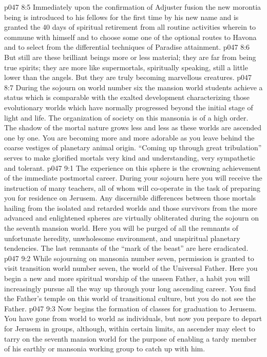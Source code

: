 \vs p047 8:5 Immediately upon the confirmation of Adjuster fusion the new morontia being is introduced to his fellows for the first time by his new name and is granted the 40 days of spiritual retirement from all routine activities wherein to commune with himself and to choose some one of the optional routes to Havona and to select from the differential techniques of Paradise attainment.
\vs p047 8:6 \pc But still are these brilliant beings more or less material; they are far from being true spirits; they are more like supermortals, spiritually speaking, still a little lower than the angels. But they are truly becoming marvellous creatures.
\vs p047 8:7 During the sojourn on world number six the mansion world students achieve a status which is comparable with the exalted development characterizing those evolutionary worlds which have normally progressed beyond the initial stage of light and life. The organization of society on this mansonia is of a high order. The shadow of the mortal nature grows less and less as these worlds are ascended one by one. You are becoming more and more adorable as you leave behind the coarse vestiges of planetary animal origin. “Coming up through great tribulation” serves to make glorified mortals very kind and understanding, very sympathetic and tolerant.
\vs p047 9:1 The experience on this sphere is the crowning achievement of the immediate postmortal career. During your sojourn here you will receive the instruction of many teachers, all of whom will co\hyp{}operate in the task of preparing you for residence on Jerusem. Any discernible differences between those mortals hailing from the isolated and retarded worlds and those survivors from the more advanced and enlightened spheres are virtually obliterated during the sojourn on the seventh mansion world. Here you will be purged of all the remnants of unfortunate heredity, unwholesome environment, and unspiritual planetary tendencies. The last remnants of the “mark of the beast” are here eradicated.
\vs p047 9:2 While sojourning on mansonia number seven, permission is granted to visit transition world number seven, the world of the Universal Father. Here you begin a new and more spiritual worship of the unseen Father, a habit you will increasingly pursue all the way up through your long ascending career. You find the Father’s temple on this world of transitional culture, but you do not see the Father.
\vs p047 9:3 \pc Now begins the formation of classes for graduation to Jerusem. You have gone from world to world as individuals, but now you prepare to depart for Jerusem in groups, although, within certain limits, an ascender may elect to tarry on the seventh mansion world for the purpose of enabling a tardy member of his earthly or mansonia working group to catch up with him.
